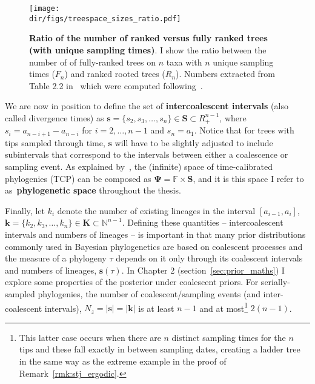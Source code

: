 \begin{figure}[!ht]
  \begin{center}
  \texttt{[image: \\dir/figs/treespace\_sizes\_ratio.pdf]} 
  \end{center}
\caption[Ratio of the number of ranked versus fully ranked trees (with unique sampling times).]{\textbf{Ratio of the number of ranked versus fully ranked trees (with unique sampling times)}.
I show the ratio between the number of of fully-ranked trees on $n$ taxa with $n$ unique sampling times ($F_n$) and ranked rooted trees ($R_n$).
Numbers extracted from Table 2.2 in~\cite{Drummond2015} which were computed following~\cite{Gavryushkina2013}.
}
\label{sfig:space_sizes}
\end{figure}

We are now in position to define the set of \textbf{intercoalescent intervals} (also called divergence times) as $\boldsymbol s = \{s_2, s_3, \ldots, s_n\} \in \boldsymbol S \subset {R}_+^{n-1}$, where $s_i = a_{n-i+1}-a_{n-i}$ for $i = 2, \ldots, n-1$ and $s_n = a_1$.
Notice that for trees with tips sampled through time, $\boldsymbol s$ will have to be slightly adjusted to include subintervals that correspond to the intervals between either a coalescence or sampling event.
As explained by~\cite{Drummond2015}, the (infinite) space of time-calibrated phylogenies (TCP) can be composed as $\boldsymbol\Psi = \mathbb{F} \times \mathbf{S}$, and it is this space I refer to as~\textbf{phylogenetic space} throughout the thesis.

Finally, let $k_i$ denote the number of existing lineages in the interval $[a_{i-1}, a_i]$, $\boldsymbol k = \{k_2, k_3, \ldots, k_n\} \in \boldsymbol K \subset \mathbb{N}^{n-1}$.
Defining these quantities -- intercoalescent intervals and numbers of lineages -- is important in that many prior distributions commonly used in Bayesian phylogenetics are based on coalescent processes and the measure of a phylogeny $\tau$ depends on it only through its coalescent intervals and numbers of lineages, $\boldsymbol s(\tau)$.
In Chapter 2 (section~\ref{sec:prior_maths}) I explore some properties of the posterior under coalescent priors.
For serially-sampled phylogenies, the number of coalescent/sampling events (and inter-coalescent intervals), $N_z = |\boldsymbol s| = |\boldsymbol k|$ is at least $n-1$ and at most\footnote{This latter case occurs when there are $n$ distinct sampling times for the $n$ tips and these fall exactly in between sampling dates, creating a ladder tree in the same way as the extreme example in the proof of Remark~\ref{rmk:stj_ergodic}. %
} $2(n-1)$.

